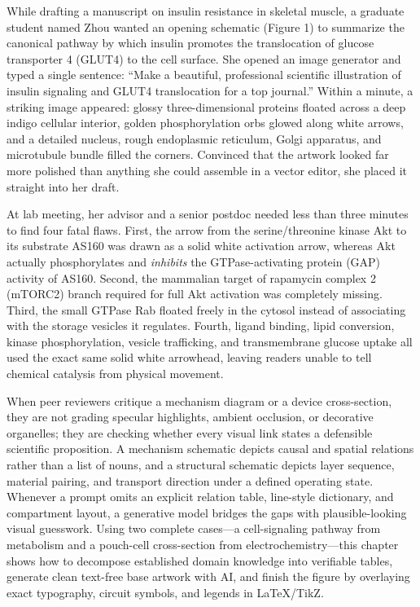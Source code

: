While drafting a manuscript on insulin resistance in skeletal muscle, a graduate student named Zhou wanted an opening schematic (Figure 1) to summarize the canonical pathway by which insulin promotes the translocation of glucose transporter 4 (GLUT4) to the cell surface. She opened an image generator and typed a single sentence: ``Make a beautiful, professional scientific illustration of insulin signaling and GLUT4 translocation for a top journal.'' Within a minute, a striking image appeared: glossy three-dimensional proteins floated across a deep indigo cellular interior, golden phosphorylation orbs glowed along white arrows, and a detailed nucleus, rough endoplasmic reticulum, Golgi apparatus, and microtubule bundle filled the corners. Convinced that the artwork looked far more polished than anything she could assemble in a vector editor, she placed it straight into her draft.

At lab meeting, her advisor and a senior postdoc needed less than three minutes to find four fatal flaws. First, the arrow from the serine/threonine kinase Akt to its substrate AS160 was drawn as a solid white activation arrow, whereas Akt actually phosphorylates and \emph{inhibits} the GTPase-activating protein (GAP) activity of AS160. Second, the mammalian target of rapamycin complex 2 (mTORC2) branch required for full Akt activation was completely missing. Third, the small GTPase Rab floated freely in the cytosol instead of associating with the storage vesicles it regulates. Fourth, ligand binding, lipid conversion, kinase phosphorylation, vesicle trafficking, and transmembrane glucose uptake all used the exact same solid white arrowhead, leaving readers unable to tell chemical catalysis from physical movement.

When peer reviewers critique a mechanism diagram or a device cross-section, they are not grading specular highlights, ambient occlusion, or decorative organelles; they are checking whether every visual link states a defensible scientific proposition. A mechanism schematic depicts causal and spatial relations rather than a list of nouns, and a structural schematic depicts layer sequence, material pairing, and transport direction under a defined operating state. Whenever a prompt omits an explicit relation table, line-style dictionary, and compartment layout, a generative model bridges the gaps with plausible-looking visual guesswork. Using two complete cases---a cell-signaling pathway from metabolism and a pouch-cell cross-section from electrochemistry---this chapter shows how to decompose established domain knowledge into verifiable tables, generate clean text-free base artwork with AI, and finish the figure by overlaying exact typography, circuit symbols, and legends in LaTeX/TikZ.

